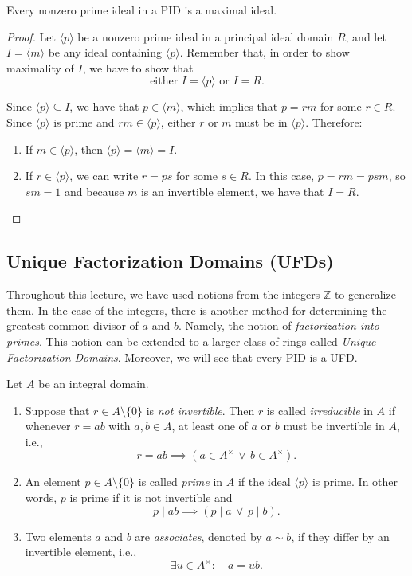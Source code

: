 \documentclass[11pt,a4paper]{article}
\begin{document}
\begin{prop}[10.2]
Every nonzero prime ideal in a PID is a maximal ideal.
\end{prop}

\begin{proof}
Let $\langle p \rangle$ be a nonzero prime ideal in a principal ideal domain $R$, and let $I = \langle m \rangle$ be any ideal containing $\langle p \rangle$. Remember that, in order to show maximality of $I$, we have to show that
\[
\text{either } I = \langle p \rangle \text{ or } I = R.
\]

Since $\langle p \rangle \subseteq I$, we have that $p \in \langle m \rangle$, which implies that $p = rm$ for some $r \in R$. Since $\langle p \rangle$ is prime and $rm \in \langle p \rangle$, either $r$ or $m$ must be in $\langle p \rangle$. Therefore:
\begin{enumerate}[label=(\roman*)]
    \item If $m \in \langle p \rangle$, then $\langle p \rangle = \langle m \rangle = I$.
    \item If $r \in \langle p \rangle$, we can write $r = ps$ for some $s \in R$. In this case, $p = rm = psm$, so $sm = 1$ and because $m$ is an invertible element, we have that $I = R$.
\end{enumerate}
\end{proof}


\subsection{Unique Factorization Domains (UFDs)}

Throughout this lecture, we have used notions from the integers $\mathbb{Z}$ to generalize them. In the case of the integers, there is another method for determining the greatest common divisor of $a$ and $b$. Namely, the notion of \textit{factorization into primes}. This notion can be extended to a larger class of rings called \textit{Unique Factorization Domains}. Moreover, we will see that every PID is a UFD.

Let $A$ be an integral domain.
\begin{enumerate}[label=(\roman*)]
    \item Suppose that $r \in A \setminus \{0\}$ is \textit{not invertible}. Then $r$ is called \textit{irreducible} in $A$ if whenever $r = ab$ with $a, b \in A$, at least one of $a$ or $b$ must be invertible in $A$, i.e.,
    \[
    r = ab \implies \left(a \in A^\times \, \lor \, b \in A^\times\right).
    \]

    \item An element $p \in A \setminus \{0\}$ is called \textit{prime} in $A$ if the ideal $\langle p \rangle$ is prime. In other words, $p$ is prime if it is not invertible and
    \[
    p \mid ab \implies \left(p \mid a \, \lor \, p \mid b\right).
    \]

    \item Two elements $a$ and $b$ are \textit{associates}, denoted by $a \sim b$, if they differ by an invertible element, i.e.,
    \[
    \exists u \in A^\times : \quad a = ub.
    \]
\end{enumerate}
\end{document}
